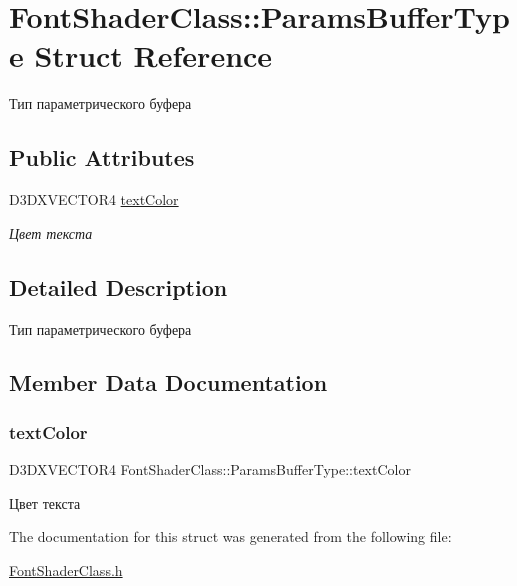\hypertarget{struct_font_shader_class_1_1_params_buffer_type}{}\section{Font\+Shader\+Class\+:\+:Params\+Buffer\+Type Struct Reference}
\label{struct_font_shader_class_1_1_params_buffer_type}


Тип параметрического буфера  


\subsection*{Public Attributes}
\begin{DoxyCompactItemize}
\item 
D3\+D\+X\+V\+E\+C\+T\+O\+R4 \hyperlink{struct_font_shader_class_1_1_params_buffer_type_a86effe4058f0bfa86af0af6a4965ffda}{text\+Color}
\begin{DoxyCompactList}\small\item\em Цвет текста \end{DoxyCompactList}\end{DoxyCompactItemize}


\subsection{Detailed Description}
Тип параметрического буфера 

\subsection{Member Data Documentation}
\mbox{\label{struct_font_shader_class_1_1_params_buffer_type_a86effe4058f0bfa86af0af6a4965ffda}} 
\subsubsection{\texorpdfstring{text\+Color}{textColor}}
{\footnotesize\ttfamily D3\+D\+X\+V\+E\+C\+T\+O\+R4 Font\+Shader\+Class\+::\+Params\+Buffer\+Type\+::text\+Color}



Цвет текста 



The documentation for this struct was generated from the following file\+:\begin{DoxyCompactItemize}
\item 
\hyperlink{_font_shader_class_8h}{Font\+Shader\+Class.\+h}\end{DoxyCompactItemize}

